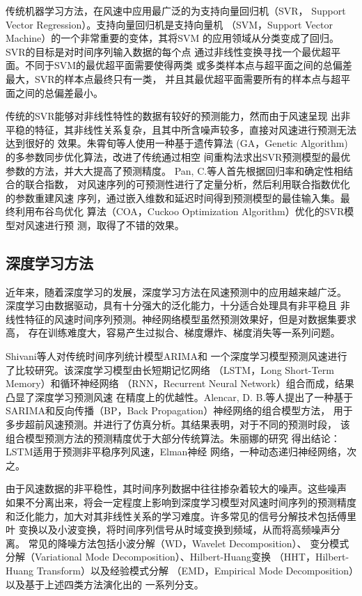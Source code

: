 \documentclass[AutoFakeBold]{LZUThesis}
\begin{document}
传统机器学习方法，在风速中应用最广泛的为支持向量回归机（SVR，
Support Vector Regression）。支持向量回归机是支持向量机
（SVM，Support Vector Machine）的一个非常重要的变体，其将SVM
的应用领域从分类变成了回归。SVR的目标是对时间序列输入数据的每个点
通过非线性变换寻找一个最优超平面。不同于SVM的最优超平面需要使得两类
或多类样本点与超平面之间的总偏差最大，SVR的样本点最终只有一类，
并且其最优超平面需要所有的样本点与超平面之间的总偏差最小。

传统的SVR能够对非线性特性的数据有较好的预测能力，然而由于风速呈现
出非平稳的特征，其非线性关系复杂，且其中所含噪声较多，直接对风速进行预测无法达到很好的
效果。朱霄旬等人使用一种基于遗传算法
(GA，Genetic Algorithm)的多参数同步优化算法，改进了传统通过相空
间重构法求出SVR预测模型的最优参数的方法，并大大提高了预测精度。
Pan, C.等人首先根据回归率和确定性相结合的联合指数，
对风速序列的可预测性进行了定量分析，然后利用联合指数优化的参数重建风速
序列，通过嵌入维数和延迟时间得到预测模型的最佳输入集。最终利用布谷鸟优化
算法（COA，Cuckoo Optimization Algorithm）优化的SVR模型对风速进行预
测，取得了不错的效果。

\subsection{深度学习方法}

近年来，随着深度学习的发展，深度学习方法在风速预测中的应用越来越广泛。
深度学习由数据驱动，具有十分强大的泛化能力，十分适合处理具有非平稳且
非线性特征的风速时间序列预测。神经网络模型虽然预测效果好，但是对数据集要求高，
存在训练难度大，容易产生过拟合、梯度爆炸、梯度消失等一系列问题。

Shivani等人对传统时间序列统计模型ARIMA和
一个深度学习模型预测风速进行了比较研究。该深度学习模型由长短期记忆网络
（LSTM，Long Short-Term Memory）和循环神经网络
（RNN，Recurrent Neural Network）组合而成，结果凸显了深度学习预测风速
在精度上的优越性。Alencar, D. B.等人提出了一种基于
SARIMA和反向传播（BP，Back Propagation）神经网络的组合模型方法，
用于多步超前风速预测。并进行了仿真分析。其结果表明，对于不同的预测时段，
该组合模型预测方法的预测精度优于大部分传统算法。朱丽娜的研究
得出结论：LSTM适用于预测非平稳序列风速，Elman神经
网络，一种动态递归神经网络，次之。

由于风速数据的非平稳性，其时间序列数据中往往掺杂着较大的噪声。这些噪声
如果不分离出来，将会一定程度上影响到深度学习模型对风速时间序列的预测精度
和泛化能力，加大对其非线性关系的学习难度。许多常见的信号分解技术包括傅里叶
变换以及小波变换，将时间序列信号从时域变换到频域，从而将高频噪声分离。
常见的降噪方法包括小波分解（WD，Wavelet Decomposition）、
变分模式分解（Variational Mode Decomposition）、Hilbert-Huang变换
（HHT，Hilbert-Huang Transform）以及经验模式分解
（EMD，Empirical Mode Decomposition）以及基于上述四类方法演化出的
一系列分支。
\end{document}
